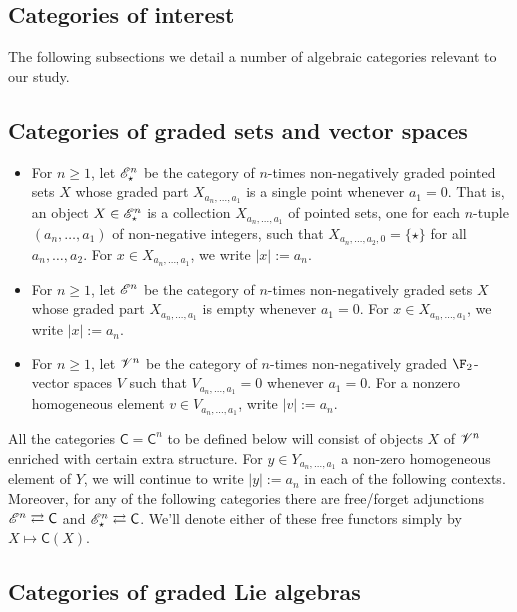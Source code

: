 \documentclass[11pt]{article}
\newcommand{\GS}[1]{\scrE^{#1}}
\newcommand{\GpS}[1]{\scrE^{#1}_\star}
\newcommand{\GR}[1]{\scrV^{#1}}%
\newcommand{\Fr}[1]{#1}%
\begin{document}
\begin{CategoriesOfInterest}
\section*{Categories of interest}
The following subsections we detail a number of algebraic categories relevant to our study.
\subsection*{Categories of graded sets and vector spaces}
\begin{itemize}
\setlength{\parindent}{.25in}
\item For $n\geq1$, let $\GpS{n}$ be the category of $n$-times non-negatively graded pointed sets $X$ whose graded part $X_{a_n,\ldots,a_1}$ is a single point whenever $a_1=0$. That is, an object $X\in\GpS{n}$ is a collection $X_{a_n,\ldots,a_1}$ of pointed sets, one for each $n$-tuple $(a_n,\ldots,a_1)$ of non-negative integers, such that $X_{a_n,\ldots,a_2,0}=\{\star\}$ for all $a_n,\ldots,a_2$. For $x\in X_{a_n,\ldots,a_1}$, we write $|x|:=a_n$.
\item For $n\geq1$, let $\GS{n}$ be the category of $n$-times non-negatively graded sets $X$ whose graded part $X_{a_n,\ldots,a_1}$ is empty whenever $a_1=0$. For $x\in X_{a_n,\ldots,a_1}$, we write $|x|:=a_n$.

\item For $n\geq1$, let $\GR{n}$ be the category of $n$-times non-negatively graded $\F_2$-vector spaces $V$ such that $V_{a_n,\ldots,a_1}=0$ whenever $a_1=0$.  For a nonzero homogeneous element $v\in V_{a_n,\ldots,a_1}$, write $|v|:=a_n$.
\end{itemize}
All the categories $\mathsf{C}=\mathsf{C}^n$ to be defined below will consist of objects $X$ of $\GR{n}$ enriched with certain extra structure. For $y\in Y_{a_n,\ldots,a_1}$ a non-zero homogeneous element of $Y$, we will continue to write $|y|:=a_n$ in each of the following contexts.
Moreover, for any of the following categories there are free/forget adjunctions $\GS{n} \rightleftarrows \mathsf{C}$ and $\GpS{n} \rightleftarrows \mathsf{C}$. We'll denote either of these free functors simply by $X\mapsto\Fr{\mathsf{C}}(X)$.


\subsection*{Categories of graded Lie algebras}


\end{CategoriesOfInterest}
\end{document}
